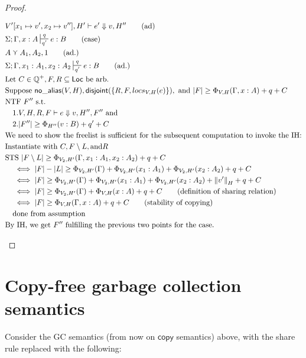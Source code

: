 \documentclass[11pt]{article}
\newcommand{\ms}[1]{\ensuremath{\mathsf{#1}}}
\newcounter{rule}
\newcommand{\na}[1]{\mathsf{no\_alias}(#1)}
\newcommand{\dist}[1]{\mathsf{disjoint}(#1)}
\newcommand{\ssize}[2]{\left\Vert #2 \right\Vert_{#1}}
\theoremstyle{definition}
\begin{document}
\begin{proof}
\begin{description}
\begin{align*}
	&V'[x_1 \mapsto v',x_2 \mapsto v''], H' \vdash e' \Downarrow v,H'' \tag{ad}\\
	&\Sigma;\Gamma,x:A \sststile{q'}{q} e : B \tag{case}\\
	&A \curlyvee A_1,A_2,1 \tag{ad.}\\
	&\Sigma; \Gamma,x_1:A_1,x_2:A_2 \sststile{q'}{q} e : B \tag{ad.}\\
  &\text{Let } C \in \mathbb{Q}^+, F,R \subseteq \ms{Loc} \text{ be arb.}\\
  &\text{Suppose }  \na{V,H}, \dist{\{R,F,locs_{V,H}(e)\}}, \text{ and } |F| 
		\ge \Phi_{V,H}(\Gamma,x:A) + q + C\\
  &\text{NTF } F'' \text{ s.t. }\\
  &\quad 1. V,H,R,F \vdash e \Downarrow v, H'',F'' \text{ and }\\ 
  &\quad 2. |F''| \ge \Phi_{H''}(v:B) + q' + C\\
	&\text{We need to show the freelist is sufficient for the subsequent computation to invoke the IH:}\\
	&\text{Instantiate with } C, F \setminus L, \text{and} R\\
	&\text{STS } |F\setminus L| \ge \Phi_{V_2, H'}(\Gamma,x_1 : A_1,x_2 : A_2) + q + C\\
	&\quad \iff |F| - |L| \ge \Phi_{V_2,H'}(\Gamma) + 
			\Phi_{V_2,H'}(x_1 : A_1) + \Phi_{V_2,H'}(x_2 : A_2) + q + C\\
	&\quad \iff |F| \ge \Phi_{V_2,H'}(\Gamma) + 
			\Phi_{V_2,H'}(x_1 : A_1) + \Phi_{V_2,H'}(x_2 : A_2) + \ssize{H}{v'} + q + C\\
	&\quad \iff |F| \ge \Phi_{V_2,H'}(\Gamma) + 
			\Phi_{V,H}(x : A) + q + C \tag{definition of sharing relation}\\
	&\quad \iff |F| \ge \Phi_{V,H}(\Gamma,x:A) + q + C \tag{stability of copying}\\
	&\quad \text{done from assumption}\\
	&\text{By IH, we get } F'' \text{ fulfilling the previous two points for the case. }\\
	\end{align*}
  \end{description}
\end{proof}

\section{Copy-free garbage collection semantics}

Consider the GC semantics (from now on $\mathsf{copy}$ semantics) above,
with the share rule replaced with the following: 
\end{document}
